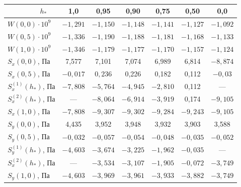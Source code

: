 \begin{table}[h!]

\centering

\small 

\caption{\label{ned:tab:3}}

\vspace{-3mm}

\setlength{\extrarowheight}{1pt}

\setlength{\tabcolsep}{10pt}

\begin{tabular}{l|c|c|c|c|c|c}

\hline

~~~~~~~~\footnotesize $h_{*}$ & \footnotesize 1,0 & \footnotesize 0,95 & \footnotesize 0,90 & \footnotesize 0,75 & \footnotesize 0,50 & \footnotesize 0,0\\

\hline

\rule{0mm}{14pt}%

$W(0,0)\cdot 10^9$ & $-1,291$ & $-1,150$ & $-1,148$ & $-1,141$ & $-1,127$ & $-1,092$\\

$W(0,5)\cdot 10^9$ & $-1,336$ & $-1,190$ & $-1,188$ & $-1,181$ & $-1,168$ & $-1,133$\\

$W(1,0)\cdot 10^9$ & $-1,346$ & $-1,179$ & $-1,177$ & $-1,170$ & $-1,157$ & $-1,124$\\

$S_x(0,0)$, Па & 7,577 & 7,101 & 7,074 & 6,989 & 6,814 & $-8,874$\\

$S_x(0,5)$, Па & $-0,017$ & $0,236$ & 0,226 & 0,182 & 0,112 & $-0,03$\\

$S_x^{(1)}(h_*)$,  Па & $-7,808$ & $-5,764$ & $-4,945$ & $-2,810$ & 0,112 & ---\\

$S_x^{(2)}(h_*)$, Па &  --- & $-8,064$ & $-6,914$ & $-3,919$ & 0,174 & $-9,105$\\

$S_x(1,0)$, Па & $-7,808$ & $-9,307$ & $-9,302$ & $-9,284$ & $-9,243$ & $-9,105$\\

$S_y(0,0)$, Па & 4,435 & 3,952 & 3,948 & 3,932 & 3,903 & 3,588\\

$S_y(0,5)$, Па & $-0,032$ & $-0,057$ & $-0,054$ & $-0,048$ & $-0,035$ & $-0,052$\\

$S_y^{(1)}(h_*)$, Па & $-4,603$ & $-3,674$ & $-3,225$ & $-1,962$ & $-0,035$ & ---\\

$S_x^{(2)}(h_*)$, Па & --- & $-3,534$ & $-3,107$ & $-1,905$ & $-0,072$ & $-3,749$\\

$S_y(1,0)$, Па & $-4,603$ & $-3,969$ & $-3,961$ & $-3,933$ & $-3,882$ & $-3,749$\\

\hline

\end{tabular}

\end{table}
